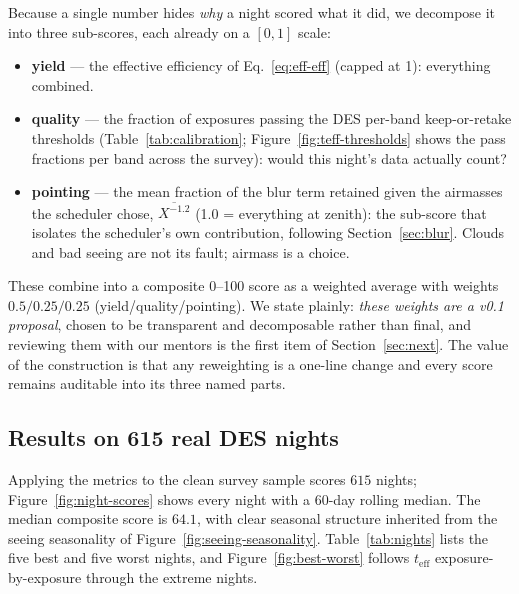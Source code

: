 \documentclass[11pt]{article}
\newcommand{\teff}{t_{\mathrm{eff}}}
\begin{document}
Because a single number hides \emph{why} a night scored what it did, we decompose it
into three sub-scores, each already on a $[0,1]$ scale:
\begin{itemize}
  \item \textbf{yield} --- the effective efficiency of Eq.~\eqref{eq:eff-eff}
    (capped at 1): everything combined.
  \item \textbf{quality} --- the fraction of exposures passing the DES per-band
    keep-or-retake thresholds (Table~\ref{tab:calibration};
    Figure~\ref{fig:teff-thresholds} shows the pass fractions per band across the
    survey): would this night's data actually count?
  \item \textbf{pointing} --- the mean fraction of the blur term retained given the
    airmasses the scheduler chose, $\overline{X^{-1.2}}$ (1.0 = everything at
    zenith): the sub-score that isolates the scheduler's own contribution, following
    Section~\ref{sec:blur}. Clouds and bad seeing are not its fault; airmass is a
    choice.
\end{itemize}
These combine into a composite 0--100 score as a weighted average with weights
$0.5 / 0.25 / 0.25$ (yield/quality/pointing). We state plainly: \emph{these weights
are a v0.1 proposal}, chosen to be transparent and decomposable rather than final,
and reviewing them with our mentors is the first item of Section~\ref{sec:next}. The
value of the construction is that any reweighting is a one-line change and every
score remains auditable into its three named parts.

\subsection{Results on 615 real DES nights}

Applying the metrics to the clean survey sample scores $615$ nights;
Figure~\ref{fig:night-scores} shows every night with a 60-day rolling median. The
median composite score is $64.1$, with clear seasonal structure inherited from the
seeing seasonality of Figure~\ref{fig:seeing-seasonality}.
Table~\ref{tab:nights} lists the five best and five worst nights, and
Figure~\ref{fig:best-worst} follows $\teff$ exposure-by-exposure through the extreme
nights.
\end{document}
